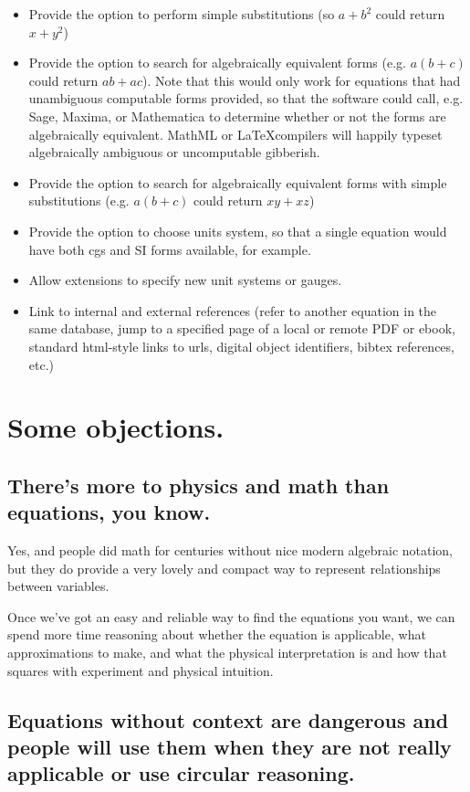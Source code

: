 \documentclass[12pt,letterpaper]{article}
\begin{document}
\begin{itemize}
\item Provide the option to perform simple substitutions (so $a+b^2$ could return $x+y^2$)
\item Provide the option to search for algebraically equivalent forms (e.g. $a(b+c)$ could return $a b + a c$). Note that this would only work for equations that had unambiguous computable forms provided, so that the software could call, e.g. Sage, Maxima, or Mathematica to determine whether or not the forms are algebraically equivalent. MathML or \LaTeX compilers will happily typeset algebraically ambiguous or uncomputable gibberish.
\item Provide the option to search for algebraically equivalent forms with simple substitutions (e.g.  $a(b+c)$ could return $ x y + x z$)
\item Provide the option to choose units system, so that a single equation would have both cgs and SI forms available, for example.
\item Allow extensions to specify new unit systems or gauges.
\item Link \label{linking} to internal and external references (refer to another equation in the same database, jump to a specified page of a local or remote PDF or ebook, standard html-style links to  urls, digital object identifiers, bibtex references, etc.) 
\end{itemize}

\section{Some objections.}

\subsection{There's more to physics and math than equations, you know.}

Yes, and people did math for centuries without nice modern algebraic notation, but they do provide a very lovely and compact way to represent relationships between variables.

Once we've got an easy and reliable way to find the equations you want, we can spend more time reasoning about whether the equation is applicable, what approximations to make, and what the physical interpretation is and how that squares with experiment and physical intuition.

\subsection{Equations without context are dangerous and people will use them when they are not really applicable or use circular reasoning.}
\end{document}
